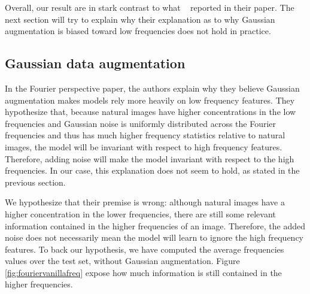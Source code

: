 \documentclass{article} \author{Simon Théorêt}
\begin{document}
Overall, our result are in stark contrast to what
~\citep{yin2020fourier} reported in their paper. The next section will
try to explain why their explanation as to why Gaussian augmentation
is biased toward low frequencies does not hold in practice.

\subsection{Gaussian data augmentation}
In the Fourier perspective paper, the authors explain why they believe
Gaussian augmentation makes models rely more heavily on low frequency
features. They hypothesize that, because natural images have higher
concentrations in the low frequencies and Gaussian noise is uniformly
distributed across the Fourier frequencies and thus has much higher
frequency statistics relative to natural images, the model will be
invariant with respect to high frequency features. Therefore, adding
noise will make the model invariant with respect to the high
frequencies. In our case, this explanation does not seem to hold, as
stated in the previous section.

We hypothesize that their premise is wrong: although natural images
have a higher concentration in the lower frequencies, there are still
some relevant information contained in the higher frequencies of an
image. Therefore, the added noise does not necessarily mean the model
will learn to ignore the high frequency features. To back our
hypothesis, we have computed the average frequencies values over the
test set, without Gaussian augmentation. Figure
\ref{fig:fouriervanillafreq} expose how much information is still
contained in the higher frequencies.
\end{document}
